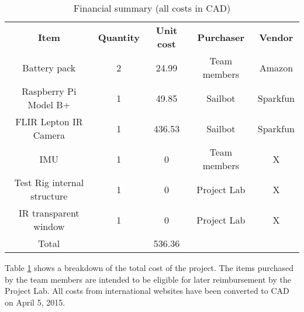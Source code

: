 
\begin{table}
\caption[Financial summary]{\label{tab:financialsummary}Financial summary (all costs in CAD)}
\begin{tabular}{c|c|c|c|c}
\textbf{Item} & \textbf{Quantity} & \textbf{Unit cost} & \textbf{Purchaser} & \textbf{Vendor}\\
Battery pack & 2 & 24.99 & Team members & Amazon\\
Raspberry Pi Model B+ & 1 & 49.85 & Sailbot & Sparkfun\\
FLIR Lepton IR Camera & 1 & 436.53 & Sailbot & Sparkfun\\
IMU & 1 & 0 & Team members & X\\
Test Rig internal structure & 1 & 0 & Project Lab & X\\
IR transparent window & 1 & 0 & Project Lab & X\\\hline
Total & & 536.36 & & \\

\end{tabular}
\end{table}

Table \ref{tab:financialsummary} shows a breakdown of the total cost of the project. The items purchased by the team members are intended to be eligible for later reimbursement by the Project Lab. All costs from international websites have been converted to CAD on April 5, 2015.
